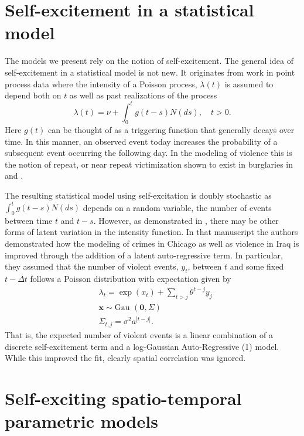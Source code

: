 \documentclass[11pt]{isuthesis}
\begin{document}
\section{Self-excitement in a statistical model}
The models we present rely on the notion of self-excitement.  The general idea of self-excitement in a statistical model is not new.  It originates from \cite{hawkes1971spectra} work in point process data where the intensity of a Poisson process, $\lambda(t)$ is assumed to depend both on $t$ as well as past realizations of the process
\begin{equation}
\lambda(t)=\nu + \int_{0}^t g(t-s)N(ds),\quad t>0.
\end{equation}
Here $g(t)$ can be thought of as a triggering function that generally decays over time.  In this manner, an observed event today increases the probability of a subsequent event occurring the following day.  In the modeling of violence this is the notion of repeat, or near repeat victimization shown to exist in burglaries in \cite{johnson1997new} and \cite{johnson2007space}. 

The resulting statistical model using self-excitation is doubly stochastic as $\int_{0}^t g(t-s)N(ds)$ depends on a random variable, the number of events between time $t$ and $t-s$.  However, as demonstrated in \cite{mohler2013modeling}, there may be other forms of latent variation in the intensity function.  In that manuscript the authors demonstrated how the modeling of crimes in Chicago as well as violence in Iraq is improved through the addition of a latent auto-regressive term.  In particular, they assumed that the number of violent events, $y_t$, between $t$ and some fixed $t-\Delta t$ follows a Poisson distribution with expectation given by
\begin{align}
& \lambda_t  =\exp(x_t)+\sum_{t>j} \theta^{t-j} y_j\\
& \boldsymbol{x} \sim \mbox{Gau }(\boldsymbol{0},\Sigma)\\
& \Sigma_{t,j} =\sigma^2 a^{|t-j|}.
\end{align}
That is, the expected number of violent events is a linear combination of a discrete self-excitement term and a log-Gaussian Auto-Regressive (1) model.  While this improved the fit, clearly spatial correlation was ignored.

\section{Self-exciting spatio-temporal parametric models}
\end{document}
